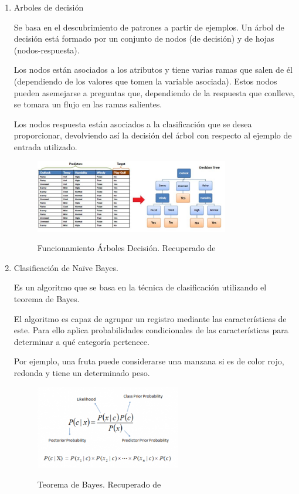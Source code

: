 \begin{enumerate}
\item Arboles de decisión

Se basa en el descubrimiento de patrones a partir de ejemplos. Un árbol de decisión está formado por un conjunto de nodos (de decisión) y de hojas (nodos-respuesta).

Los nodos están asociados a los atributos y tiene varias ramas que salen de él (dependiendo de los valores que tomen la variable asociada). Estos nodos pueden asemejarse a preguntas que, dependiendo de la respuesta que conlleve, se tomara un flujo en las ramas salientes.

Los nodos respuesta están asociados a la clasificación que se desea proporcionar, devolviendo así la decisión del árbol con respecto al ejemplo de entrada utilizado.

\begin{figure}[htb]
\centering
\caption{Funcionamiento Árboles Decisión. Recuperado de \protect{}}
 \includegraphics[width=0.8\textwidth]{recursos/arbol_decision_img1}
\label{fig:fun_arb_dec}
\end{figure}
\FloatBarrier


\item Clasificación de Naïve Bayes.

Es un algoritmo que se basa en la técnica de clasificación utilizando el teorema de Bayes.

El algoritmo es capaz de agrupar un registro mediante las características de este. Para ello aplica probabilidades condicionales de las características para determinar a qué categoría pertenece. 

Por ejemplo, una fruta puede considerarse una manzana si es de color rojo, redonda y tiene un determinado peso.

\begin{figure}[htb]
\centering
\caption{Teorema de Bayes. Recuperado de \protect\cite{uCincinnati2018}}
 \includegraphics[width=0.6\textwidth]{recursos/BayesFormula}
\label{fig:BayesFormula}
\end{figure}
\FloatBarrier


\end{enumerate}
